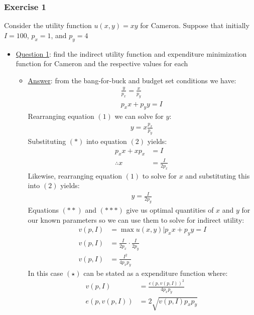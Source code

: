 \documentclass{article}
\begin{document}
\subsubsection{Exercise 1}
Consider the utility function $u(x,y) = xy$ for Cameron. Suppose that initially $I = 100$, $p_{x} = 1$, and $p_{y} = 4$ \par \vspace{0.3em}
\begin{itemize}
  \item  \underline{Question 1}: find the indirect utility function and expenditure minimization function for Cameron and  the respective values for each
  \begin{itemize}
    \item  \underline{Answer}: from the bang-for-buck and budget set conditions we have:
    \begin{gather*}
      \frac{y}{p_{x}} = \frac{x}{p_{y}} \ \tag{1} \\
      p_{x}x + p_{y}y = I \ \tag{2}
    \end{gather*}
    Rearranging equation $(1)$ we can solve for $y$:
    \begin{gather*}
      y = x \frac{p_{x}}{p_{y}} \ \tag{*}
    \end{gather*}
    Substituting $(*)$ into equation $(2)$ yields:
    \begin{align*}
      p_{x}x + xp_{x} &= I \\
      \therefore x &= \frac{I}{2p_{x}} \ \tag{**}
    \end{align*}
    Likewise, rearranging equation $(1)$ to solve for $x$ and substituting this into $(2)$ yields:
    \begin{gather*}
      y = \frac{I}{2p_{y}} \ \tag{***}
    \end{gather*}
    Equations $(**)$ and $(***)$ give us optimal quantities of $x$ and $y$ for our known parameters so we can use them to solve for indirect utility:
    \begin{align*}
      v(p,I) &= \max u(x,y) | p_{x}x + p_{y}y = I \\
      v(p,I) &= \frac{I}{2p_{x}} \cdot \frac{I}{2p_{y}} \\
      v(p,I) &= \frac{I^{2}}{4p_{x}p_{y}} \ \tag{$\star$}
    \end{align*}
    In this case $(\star)$ can be stated as a expenditure function where:
    \begin{align*}
      v(p,I) &= \frac{e(p,v(p,I))^{2}}{4p_{x}p_{y}} \\
      e(p,v(p,I)) &= 2 \sqrt{v(p,I)p_{x}p_{y}} \ \tag{$\star \star$}

\end{align*}
\end{itemize}
\end{itemize}
\end{document}

